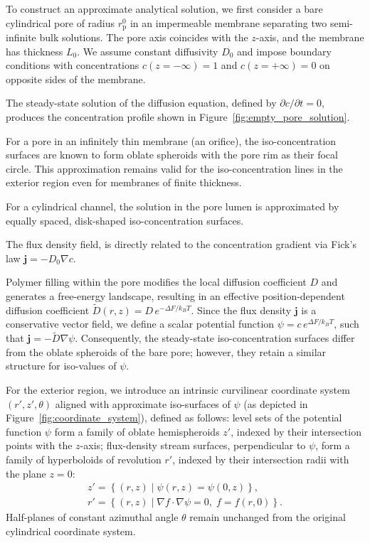 \documentclass[10pt, a4paper]{article}
\begin{document}
\begin{multicols}{2}

To construct an approximate analytical solution, we first consider a bare cylindrical pore of radius $r_{\text{p}}^{0}$ in an impermeable membrane separating two semi-infinite bulk solutions.
The pore axis coincides with the $z$-axis, and the membrane has thickness $L_{0}$.
We assume constant diffusivity $D_0$ and impose boundary conditions with concentrations $c(z=-\infty)=1$ and $c(z=+\infty)=0$ on opposite sides of the membrane.

The steady-state solution of the diffusion equation, defined by $\partial c/\partial t = 0$, produces the concentration profile shown in Figure~\ref{fig:empty_pore_solution}.

For a pore in an infinitely thin membrane (an orifice), the iso-concentration surfaces are known to form oblate spheroids with the pore rim as their focal circle.
This approximation remains valid for the iso-concentration lines in the exterior region even for membranes of finite thickness.

For a cylindrical channel, the solution in the pore lumen is approximated by equally spaced, disk-shaped iso-concentration surfaces. 

The flux density field, is directly related to the concentration gradient via Fick's law \mbox{$\bm{j} = -D_0 \nabla c$}.

Polymer filling within the pore modifies the local diffusion coefficient $D$ and generates a free-energy landscape, resulting in an effective position-dependent diffusion coefficient $\tilde{D}(r,z) = D\,e^{-\Delta F/k_B T}$.
Since the flux density $\bm{j}$ is a conservative vector field, we define a scalar potential function $\psi = c\,e^{\Delta F/k_B T}$, such that $\bm{j} = -\tilde{D}\nabla\psi$.
Consequently, the steady-state iso-concentration surfaces differ from the oblate spheroids of the bare pore; however, they retain a similar structure for iso-values of $\psi$.

For the exterior region, we introduce an intrinsic curvilinear coordinate system $(r', z', \theta)$ aligned with approximate iso-surfaces of \(\psi\) (as depicted in Figure~\ref{fig:coordinate_system}), defined as follows:
level sets of the potential function $\psi$ form a family of oblate hemispheroids $z'$, indexed by their intersection points with the $z$-axis;
flux-density stream surfaces, perpendicular to $\psi$, form a family of hyperboloids of revolution $r'$, indexed by their intersection radii with the plane $z=0$:
\begin{gather}
    z' = \left\{(r,z) \mid \psi(r,z)=\psi(0,z)\right\},
    \\
    r' = \left\{(r,z) \mid \nabla f \cdot \nabla \psi = 0,\; f=f(r,0)\right\}.
\end{gather}
Half-planes of constant azimuthal angle \(\theta\) remain unchanged from the original cylindrical coordinate system.


\end{multicols}
\end{document}
